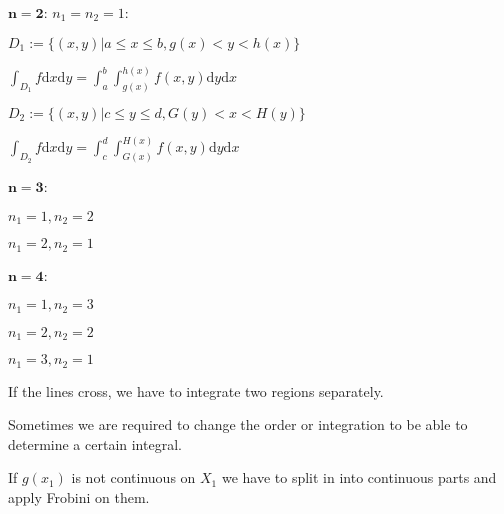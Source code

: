 \begin{compactdesc}
    \item[$\mathbf{n = 2}$:] $n_1 = n_2 = 1$:
        \begin{compactitem}
            \item $D_1 := \{(x, y) | a \le x \le b, g(x) < y < h(x) \}$
                \begin{compactitem}
                    \item $\int_{D_1} f \mathrm{d}x \mathrm{d}y = \int_{a}^{b} \int_{g(x)}^{h(x)} f(x, y) \mathrm{d}y\mathrm{d}x$
                \end{compactitem}
            \item $D_2 := \{(x, y) | c \le y \le d, G(y) < x < H(y) \}$
                \begin{compactitem}
                    \item $\int_{D_2} f \mathrm{d}x \mathrm{d}y = \int_{c}^{d} \int_{G(x)}^{H(x)} f(x, y) \mathrm{d}y\mathrm{d}x$
                \end{compactitem}
        \end{compactitem}
    \item[$\mathbf{n = 3}$:] 
        \begin{inparaitem}
            \item  $n_1 = 1, n_2 = 2$
            \item  $n_1 = 2, n_2 = 1$
        \end{inparaitem}
    \item[$\mathbf{n = 4}$:] 
        \begin{inparaitem}
            \item  $n_1 = 1, n_2 = 3$
            \item  $n_1 = 2, n_2 = 2$
            \item  $n_1 = 3, n_2 = 1$
        \end{inparaitem}
\end{compactdesc}

\begin{compactitem}
    \item If the lines cross, we have to integrate two regions separately.
    \item Sometimes we are required to change the order or integration to be able to determine a certain integral.
    \item If $g(x_1)$ is not continuous on $X_1$ we have to split in into continuous parts and apply Frobini on them.
\end{compactitem}

